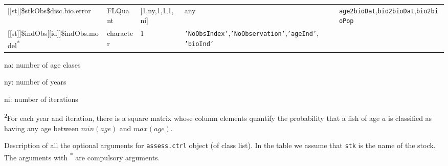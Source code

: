 \begin{landscape}
\begin{table}[!ht]
\begin{footnotesize}
\begin{threeparttable}
\begin{tabular}{lllll}
        {[[st]]}\$stkObs\$disc.bio.error & FLQuant & [1,ny,1,1,1,ni] & any & \texttt{age2bioDat},\texttt{bio2bioDat},\texttt{bio2bioPop} \\
        {[[st]]}\$indObs[[id]]\$indObs.model\textsuperscript{*} & character & 1 & \texttt{'NoObsIndex'},\texttt{'NoObservation'},\texttt{'ageInd'},
          \texttt{'bioInd'} &  \\
        \hline
      \end{tabular}

      \begin{tablenotes}
        \item na: number of age clases
        \item ny: number of years
        \item ni: number of iterations
        \item \textsuperscript{2}For each year and iteration, there is a square matrix
          whose column elements quantify the probability that a fish of age $a$ is classified as having any age between
          $min(age)$ and $max(age)$.
      \end{tablenotes}

    \end{threeparttable}
  \end{footnotesize}

\end{table}
	

\begin{table}[!ht]

  \centering
  \begin{footnotesize}

    \caption{Description of all the optional arguments for \texttt{assess.ctrl} object (of class list).
    In the table we assume that \texttt{stk} is the name of the stock.
    The arguments with \textsuperscript{*} are compulsory arguments.}
    

\end{footnotesize}
\end{table}
\end{landscape}

